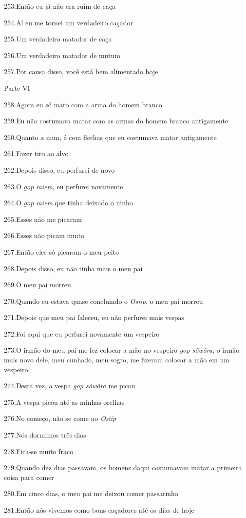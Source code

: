 253.Então eu já não era ruim de caça

254.Aí eu me tornei um verdadeiro caçador

255.Um verdadeiro matador de caça

256.Um verdadeiro matador de mutum

257.Por causa disso, você está bem alimentado hoje

Parte VI

258.Agora eu só mato com a arma do homem branco

259.Eu não costumava matar com as armas do homem branco antigamente

260.Quanto a mim, é com flechas que eu costumava matar antigamente

261.Fazer tiro ao alvo

262.Depois disso, eu perfurei de novo

263.O \emph{gop miem}, eu perfurei novamente

264.O \emph{gop miem} que tinha deixado o ninho

265.Esses não me picaram

266.Esses não picam muito

267.Então eles só picaram o meu peito

268.Depois disso, eu não tinha mais o meu pai

269.O meu pai morreu

270.Quando eu estava quase concluindo o \emph{Osiip}, o meu pai morreu

271.Depois que meu pai faleceu, eu não perfurei mais vespas

272.Foi aqui que eu perfurei novamente um vespeiro

273.O irmão do meu pai me fez colocar a mão no vespeiro \emph{gop
sõwõra}, o irmão mais novo dele, meu cunhado, meu sogro, me fizeram
colocar a mão em um vespeiro

274.Desta vez, a vespa \emph{gop sõwõra} me picou

275.A vespa picou até as minhas orelhas

276.No começo, não se come no \emph{Osiip}

277.Nós dormimos três dias

278.Fica-se muito fraco

279.Quando dez dias passavam, os homens daqui costumavam matar a
primeira coisa para comer

280.Em cinco dias, o meu pai me deixou comer passarinho

281.Então nós vivemos como bons caçadores até os dias de hoje

